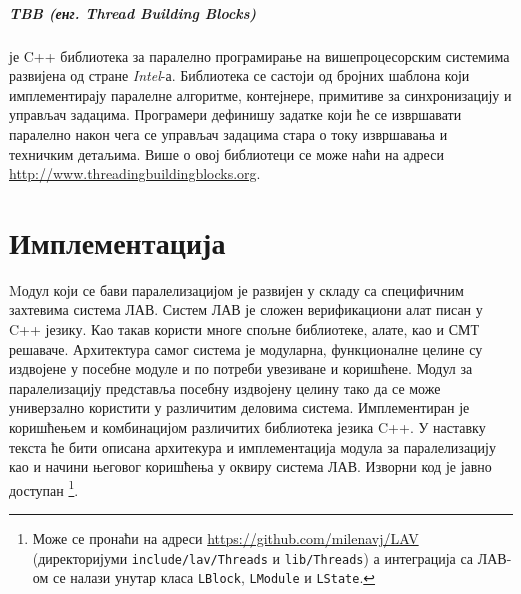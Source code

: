 \documentclass[12pt,oneside]{memoir}
\begin{document}
\paragraph{TBB (енг. Thread Building Blocks)} је C++ библиотека за паралелно програмирање на вишепроцесорским системима развијена од стране \emph{Intel}-а. Библиотека се састоји од бројних шаблона који имплементирају паралелне алгоритме, контејнере, примитиве за синхронизацију и управљач задацима. Програмери дефинишу задатке који ће се извршавати паралелно након чега се управљач задацима стара о току извршавања и техничким детаљима. Више о овој библиотеци се може наћи на адреси \url{http://www.threadingbuildingblocks.org}.


  
\chapter{Имплементација}

Mодул који се бави паралелизацијом је развијен у складу са специфичним захтевима система ЛАВ. Систем ЛАВ је сложен верификациони алат писан у C++ језику. Као такав користи многе спољне библиотеке, алате, као и СМТ решаваче.  Архитектура самог система је модуларна, функционалне целине су издвојене у посебне модуле и по потреби увезиване и коришћене. Модул за паралелизацију представља посебну издвојену целину тако да се може универзално користити у различитим деловима система. Имплементиран је коришћењем  и комбинацијом различитих библиотека језика C++.   У наставку текста ће бити описана архитекура и имплементација модула за паралелизацију као и начини његовог коришћења у оквиру система ЛАВ. Изворни код је јавно доступан \footnote{Може се пронаћи на адреси \url{https://github.com/milenavj/LAV} (директоријуми \texttt{include/lav/Threads} и \texttt{lib/Threads}) а интеграција са ЛАВ-ом се налази унутар класа \texttt{LBlock}, \texttt{LModule} и \texttt{LState}.}.  
\end{document}
